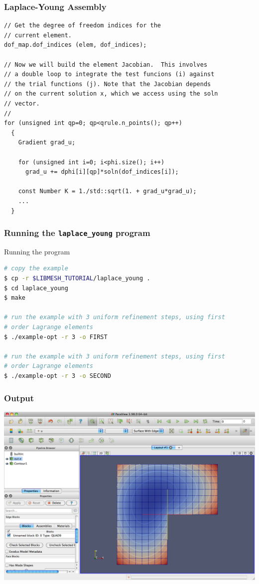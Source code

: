 \begin{frame}
  \frametitle{Laplace-Young Assembly}
  \begin{lstlisting}
// Get the degree of freedom indices for the
// current element.
dof_map.dof_indices (elem, dof_indices);

// Now we will build the element Jacobian.  This involves
// a double loop to integrate the test funcions (i) against
// the trial functions (j). Note that the Jacobian depends
// on the current solution x, which we access using the soln
// vector.
//
for (unsigned int qp=0; qp<qrule.n_points(); qp++)
  {
    Gradient grad_u;

    for (unsigned int i=0; i<phi.size(); i++)
      grad_u += dphi[i][qp]*soln(dof_indices[i]);

    const Number K = 1./std::sqrt(1. + grad_u*grad_u);
    ...
  }
  \end{lstlisting}
\end{frame}


\begin{frame}[fragile]
  \frametitle{Running the \texttt{laplace\_young} program}
    \begin{block}{Running the program}
    \begin{lstlisting}[language=bash]
# copy the example
$ cp -r $LIBMESH_TUTORIAL/laplace_young .
$ cd laplace_young
$ make

# run the example with 3 uniform refinement steps, using first
# order Lagrange elements
$ ./example-opt -r 3 -o FIRST 

# run the example with 3 uniform refinement steps, using first
# order Lagrange elements
$ ./example-opt -r 3 -o SECOND
    \end{lstlisting}
  \end{block}
\end{frame}


\frame
{
  \frametitle{Output}
  \begin{center}
    \includegraphics[height=0.8\textheight]{tutorial/laplace_young/screen}
  \end{center}
} 


